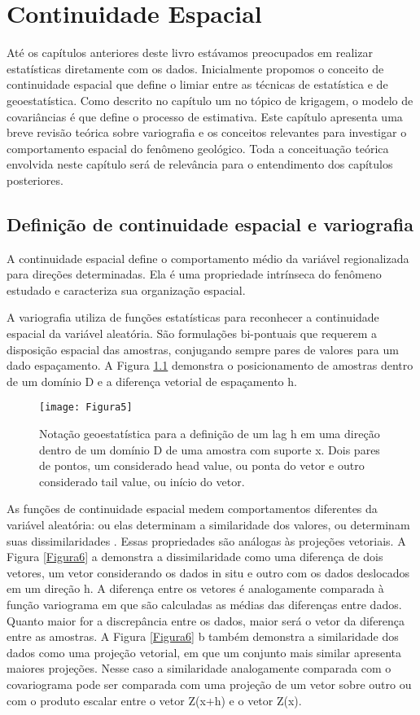 \chapter{Continuidade Espacial}

Até os capítulos anteriores deste livro estávamos preocupados em realizar estatísticas diretamente com os dados. Inicialmente  propomos o conceito de continuidade espacial que define o limiar entre as técnicas de estatística e de geoestatística. Como descrito no capítulo um no tópico de krigagem, o modelo de covariâncias é que define o processo de estimativa.  Este capítulo apresenta uma breve revisão teórica sobre variografia e os conceitos relevantes para investigar o comportamento espacial do fenômeno geológico.  Toda a conceituação teórica envolvida neste capítulo será de relevância para o entendimento dos capítulos posteriores. 

\section{Definição de continuidade espacial e variografia}

A continuidade espacial define o comportamento médio da variável regionalizada para direções determinadas.  Ela é uma propriedade intrínseca do fenômeno estudado e caracteriza sua organização espacial. 

A variografia utiliza de funções estatísticas para reconhecer a continuidade espacial da variável aleatória. São formulações bi-pontuais que requerem a disposição espacial das amostras, conjugando sempre pares de valores para um dado espaçamento. A Figura \ref{Figura5} demonstra o posicionamento de amostras dentro de um domínio D e a diferença vetorial de espaçamento h. 

\begin{figure}[H]
	\centering
	\texttt{[image: Figura5]}
	\caption{Notação geoestatística para a definição de um lag h em uma direção dentro de um domínio D de uma amostra com suporte x. Dois pares de pontos, um considerado head value, ou ponta do vetor e outro considerado tail value, ou início do vetor.}
	\label{Figura5}
\end{figure}

As funções de continuidade espacial medem comportamentos diferentes da variável aleatória: ou elas determinam a similaridade dos valores, ou determinam suas dissimilaridades . Essas propriedades são análogas às projeções vetoriais. A Figura \ref{Figura6} a demonstra a dissimilaridade como uma diferença de dois vetores, um vetor considerando os dados in situ e outro com os dados deslocados em um direção h. A diferença entre os vetores é analogamente comparada à função variograma em que são calculadas as médias das diferenças entre dados. Quanto maior for a discrepância entre os dados, maior será o vetor da diferença entre as amostras. A Figura \ref{Figura6} b também demonstra a similaridade dos dados como uma projeção vetorial, em que um conjunto mais similar apresenta maiores projeções. Nesse caso a similaridade analogamente comparada com o covariograma pode ser comparada com uma projeção de um vetor sobre outro ou com o produto escalar entre o vetor Z(x+h) e o vetor Z(x).

